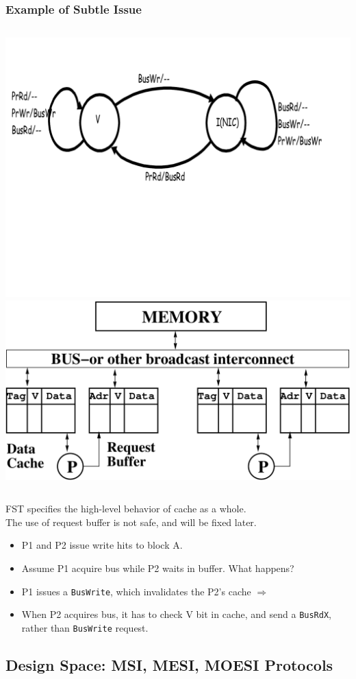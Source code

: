 \documentclass{beamer}
\newcommand{\emp}[1]{\textcolor{DikuRed}{ #1}}
\begin{document}
\begin{frame}[fragile,t]
\frametitle{Example of Subtle Issue}

\begin{columns}
\includegraphics[width=35ex]{FigsInfCoherence/SimpleCohProt}
\includegraphics[width=30ex]{FigsInfCoherence/SMPreqbuff}
\end{columns}
\vspace{-3ex}
FST specifies the \emp{high-level} behavior of cache as a whole.\\
\emp{The use of request buffer is not safe, and will be fixed later.}
\begin{itemize}
    \item P1 and P2 issue \emp{write hits} to block A. 
    \item Assume P1 acquire bus while P2 waits in buffer. \alert{What happens?}\pause
    \item P1 issues a \emp{\tt BusWrite}, which invalidates the P2's cache $\Rightarrow$
    \item When P2 acquires bus, it has to check V bit in cache, and send a \emp{\tt BusRdX},
            rather than {\tt BusWrite} request.
\end{itemize}

\end{frame}


\subsection{Design Space: MSI, MESI, MOESI Protocols}
\end{document}
